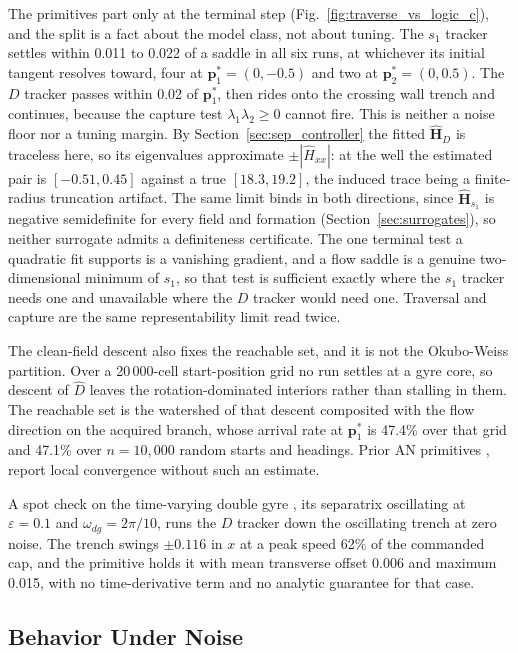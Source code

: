 \documentclass[lettersize,journal]{IEEEtran}
\begin{document}
The primitives part only at the terminal step
(Fig.~\ref{fig:traverse_vs_logic_c}), and the split is a fact about the
model class, not about tuning. The $s_1$ tracker
settles within 0.011 to 0.022 of a saddle in all six runs, at whichever
its initial tangent resolves toward, four at
$\mathbf{p}^*_1 = (0, -0.5)$ and two at $\mathbf{p}^*_2 = (0, 0.5)$. The
$D$ tracker passes within 0.02 of $\mathbf{p}^*_1$, then rides onto the
crossing wall trench and continues, because the capture test
$\lambda_1\lambda_2 \geq 0$ cannot fire. This
is neither a noise floor nor a tuning margin. By
Section~\ref{sec:sep_controller} the fitted $\hat{\mathbf{H}}_D$ is
traceless here, so its eigenvalues approximate
$\pm|\hat{H}_{xx}|$: at the well the estimated pair is
$[-0.51, 0.45]$ against a true $[18.3, 19.2]$, the induced trace being a
finite-radius truncation artifact. The same
limit binds in both directions, since $\hat{\mathbf{H}}_{s_1}$ is
negative semidefinite for every field and formation
(Section~\ref{sec:surrogates}), so neither surrogate admits a definiteness
certificate. The one terminal test a quadratic fit supports is a
vanishing gradient, and a flow saddle is a genuine two-dimensional
minimum of $s_1$, so that test is sufficient exactly where the $s_1$
tracker needs one and unavailable where the $D$ tracker would need one.
Traversal and capture are the same representability limit read twice.

The clean-field descent also fixes the reachable set, and it is not the
Okubo-Weiss partition. Over a 20\,000-cell start-position grid no run
settles at a gyre core, so descent of $\hat{D}$ leaves the
rotation-dominated interiors rather than stalling in them. The
reachable set is the watershed of that descent composited with the flow
direction on the acquired branch, whose arrival rate at
$\mathbf{p}^*_1$ is 47.4\% over that grid and 47.1\% over $n =
10{,}000$ random starts and headings. Prior AN primitives
\cite{3}, \cite{2} report local convergence without such an estimate.

A spot check on the time-varying double gyre \cite{26}, its separatrix
oscillating at $\varepsilon = 0.1$ and $\omega_{dg} =
2\pi/10$, runs the $D$ tracker down the oscillating trench at zero
noise. The trench swings $\pm 0.116$ in $x$
at a peak speed 62\% of the commanded cap, and the
primitive holds it with mean transverse offset 0.006 and maximum 0.015,
with no time-derivative term and no analytic guarantee for that case.

\subsection{Behavior Under Noise}
\label{sec:disc_noise}
\end{document}
